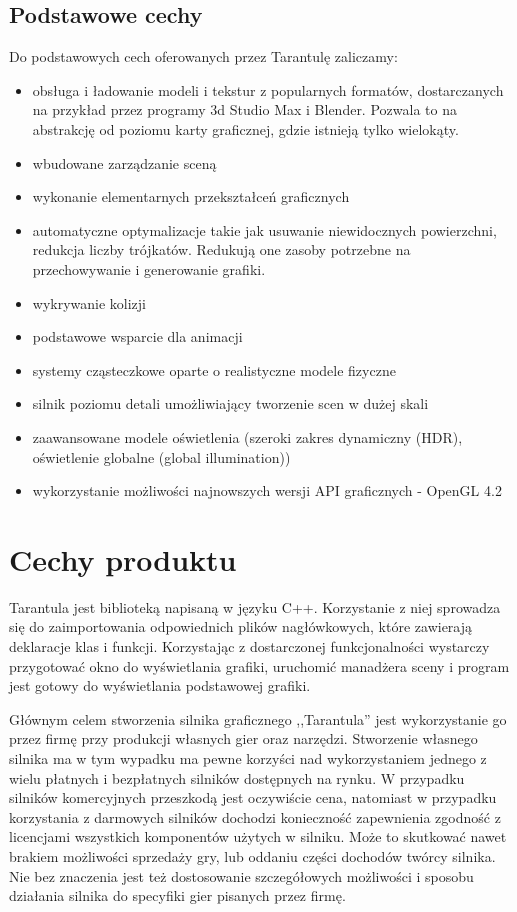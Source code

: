 \documentclass[11pt,leqno]{article}
\begin{document}
\subsection{Podstawowe cechy}
Do podstawowych cech oferowanych przez Tarantulę zaliczamy:
\begin{itemize}
 \item obsługa i ładowanie modeli i tekstur z popularnych formatów, dostarczanych na przykład przez programy 3d Studio Max i Blender. 
 Pozwala to na abstrakcję od poziomu karty graficznej, gdzie istnieją tylko wielokąty.
  \item wbudowane zarządzanie sceną
\item wykonanie elementarnych przekształceń graficznych
\item automatyczne optymalizacje takie jak usuwanie niewidocznych powierzchni, redukcja liczby trójkatów. Redukują one zasoby potrzebne na przechowywanie i generowanie grafiki.
\item wykrywanie kolizji
\item podstawowe wsparcie dla animacji
\item systemy cząsteczkowe oparte o realistyczne modele fizyczne
\item silnik poziomu detali umożliwiający tworzenie scen w dużej skali
\item zaawansowane modele oświetlenia (szeroki zakres dynamiczny (HDR), oświetlenie globalne (global illumination))
\item wykorzystanie możliwości najnowszych wersji API graficznych  - OpenGL 4.2
\end{itemize}


\section{Cechy produktu}

Tarantula jest biblioteką napisaną w języku C++. Korzystanie z niej sprowadza się do zaimportowania odpowiednich plików nagłówkowych, 
które zawierają deklaracje klas i funkcji. Korzystając z dostarczonej funkcjonalności wystarczy przygotować okno do wyświetlania grafiki, 
uruchomić manadżera sceny i program jest gotowy do wyświetlania podstawowej grafiki.


Głównym celem stworzenia silnika graficznego ,,Tarantula'' jest wykorzystanie go przez firmę przy produkcji własnych gier oraz narzędzi. 
Stworzenie własnego silnika ma w tym wypadku ma pewne korzyści nad wykorzystaniem jednego z wielu płatnych i bezpłatnych silników 
dostępnych na rynku. W przypadku silników komercyjnych przeszkodą jest oczywiście cena, natomiast w przypadku korzystania z darmowych 
silników dochodzi konieczność zapewnienia zgodność z licencjami wszystkich komponentów użytych w silniku. Może to skutkować nawet 
brakiem możliwości sprzedaży gry, lub oddaniu części dochodów twórcy silnika. Nie bez znaczenia jest też dostosowanie szczegółowych 
możliwości i sposobu działania silnika do specyfiki gier pisanych przez firmę.
\end{document}
